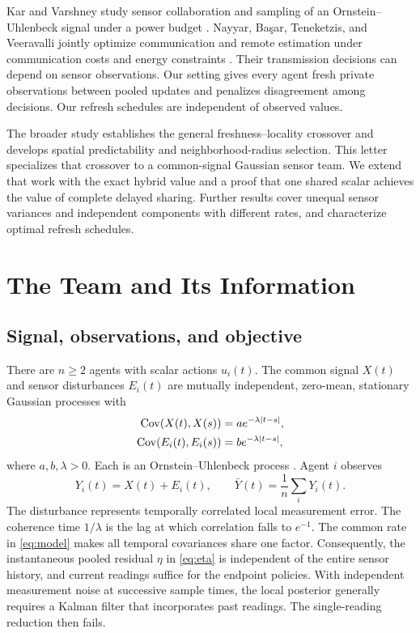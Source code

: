 \documentclass[letterpaper,10pt,conference]{ieeeconf}
\newcommand{\Cov}{\operatorname{Cov}}
\begin{document}
Kar and Varshney study sensor collaboration and sampling of an Ornstein--Uhlenbeck signal under a power budget \cite{kar2012controlled}. Nayyar, Ba\c{s}ar, Teneketzis, and Veeravalli jointly optimize communication and remote estimation under communication costs and energy constraints \cite{nayyar2013optimal}. Their transmission decisions can depend on sensor observations. Our setting gives every agent fresh private observations between pooled updates and penalizes disagreement among decisions. Our refresh schedules are independent of observed values.

The broader study \cite{tina2026} establishes the general freshness--locality crossover and develops spatial predictability and neighborhood-radius selection. This letter specializes that crossover to a common-signal Gaussian sensor team. We extend that work with the exact hybrid value and a proof that one shared scalar achieves the value of complete delayed sharing. Further results cover unequal sensor variances and independent components with different rates, and characterize optimal refresh schedules.

\section{The Team and Its Information}
\subsection{Signal, observations, and objective}
There are $n\ge2$ agents with scalar actions $u_i(t)$. The common signal $X(t)$ and sensor disturbances $E_i(t)$ are mutually independent, zero-mean, stationary Gaussian processes with
\begin{align}
 \Cov(X(t),X(s))&=a e^{-\lambda|t-s|},\notag\\
 \Cov(E_i(t),E_i(s))&=b e^{-\lambda|t-s|},\label{eq:model}
\end{align}
where $a,b,\lambda>0$. Each is an Ornstein--Uhlenbeck process \cite{uhlenbeck1930brownian}. Agent $i$ observes
\begin{equation}
 Y_i(t)=X(t)+E_i(t),\qquad \bar Y(t)=\frac1n\sum_iY_i(t).
 \label{eq:observations}
\end{equation}
The disturbance represents temporally correlated local measurement error. The coherence time $1/\lambda$ is the lag at which correlation falls to $e^{-1}$. The common rate in \eqref{eq:model} makes all temporal covariances share one factor. Consequently, the instantaneous pooled residual $\eta$ in \eqref{eq:eta} is independent of the entire sensor history, and current readings suffice for the endpoint policies. With independent measurement noise at successive sample times, the local posterior generally requires a Kalman filter that incorporates past readings. The single-reading reduction then fails.
\end{document}
